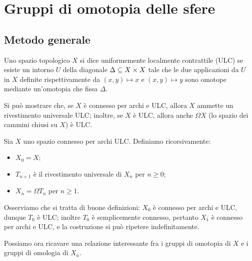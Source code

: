 \chapter{Gruppi di omotopia delle sfere}

\section{Metodo generale}

\begin{definition}
Uno spazio topologico $X$ si dice uniformemente localmente contrattile (ULC) se esiste un intorno $U$ della diagonale $\Delta\subseteq X\times X$ tale che le due applicazioni da $U$ in $X$ definite rispettivamente da $(x,y)\mapsto x$ e $(x,y)\mapsto y$ sono omotope mediante un'omotopia che fissa $\Delta$.
\end{definition}

Si può mostrare che, se $X$ è connesso per archi e ULC, allora $X$ ammette un rivestimento universale ULC; inoltre, se $X$ è ULC, allora anche $\Omega X$ (lo spazio dei cammini chiusi su $X$) è ULC.

Sia $X$ uno spazio connesso per archi ULC. Definiamo ricorsivamente:
\begin{itemize}
\item $X_0=X$;
\item $T_{n+1}$ è il rivestimento universale di $X_n$ per $n\ge 0$;
\item $X_n=\Omega T_n$ per $n\ge 1$.
\end{itemize}
Osserviamo che si tratta di buone definizioni: $X_0$ è connesso per archi e ULC, dunque $T_0$ è ULC; inoltre $T_0$ è semplicemente connesso, pertanto $X_1$ è  connesso per archi e ULC, e la costruzione si può ripetere indefinitamente.

Possiamo ora ricavare una relazione interessante fra i gruppi di omotopia di $X$ e i gruppi di omologia di $X_n$.

